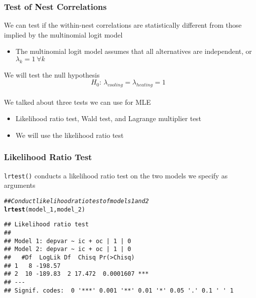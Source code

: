\documentclass{beamer}\usepackage[]{graphicx}\usepackage[]{color}
\makeatletter
\newcommand{\hlcom}[1]{\textcolor[rgb]{0.678,0.584,0.686}{\textit{#1}}}%
\newcommand{\hlstd}[1]{\textcolor[rgb]{0.345,0.345,0.345}{#1}}%
\newcommand{\hlkwd}[1]{\textcolor[rgb]{0.737,0.353,0.396}{\textbf{#1}}}%
\newenvironment{kframe}{%
 \def\at@end@of@kframe{}%
 \ifinner\ifhmode%
  \def\at@end@of@kframe{\end{minipage}}%
  \begin{minipage}{\columnwidth}%
 \fi\fi%
 \def\FrameCommand##1{\hskip\@totalleftmargin \hskip-\fboxsep
 \colorbox{shadecolor}{##1}\hskip-\fboxsep
     \hskip-\linewidth \hskip-\@totalleftmargin \hskip\columnwidth}%
 \MakeFramed {\advance\hsize-\width
   \@totalleftmargin\z@ \linewidth\hsize
   \@setminipage}}%
 {\par\unskip\endMakeFramed%
 \at@end@of@kframe}
\newenvironment{knitrout}{}{} %
\makeatother
\begin{document}
\begin{frame}\frametitle{Test of Nest Correlations}
    We can test if the within-nest correlations are statistically different from those implied by the multinomial logit model
    \begin{itemize}
    	\item The multinomial logit model assumes that all alternatives are independent, or $\lambda_k = 1 ~\forall k$
    \end{itemize}
    \vspace{3ex}
    We will test the null hypothesis
    $$H_0 \text{: } \lambda_{cooling} = \lambda_{heating} = 1$$ \\
    \vspace{3ex}
    We talked about three tests we can use for MLE
    \begin{itemize}
    	\item Likelihood ratio test, Wald test, and Lagrange multiplier test
    	\item We will use the likelihood ratio test
    \end{itemize}
\end{frame}

\begin{frame}[fragile]\frametitle{Likelihood Ratio Test}
    \texttt{lrtest()} conducts a likelihood ratio test on the two models we specify as arguments \\
\begin{knitrout}\footnotesize
{}\color{fgcolor}\begin{kframe}
\begin{alltt}
\hlcom{## Conduct likelihood ratio test of models 1 and 2}
\hlkwd{lrtest}\hlstd{(model_1, model_2)}
\end{alltt}
\begin{verbatim}
## Likelihood ratio test
## 
## Model 1: depvar ~ ic + oc | 1 | 0
## Model 2: depvar ~ ic + oc | 1 | 0
##   #Df  LogLik Df  Chisq Pr(>Chisq)    
## 1   8 -198.57                         
## 2  10 -189.83  2 17.472  0.0001607 ***
## ---
## Signif. codes:  0 '***' 0.001 '**' 0.01 '*' 0.05 '.' 0.1 ' ' 1
\end{verbatim}
\end{kframe}
\end{knitrout}
\end{frame}
\end{document}
